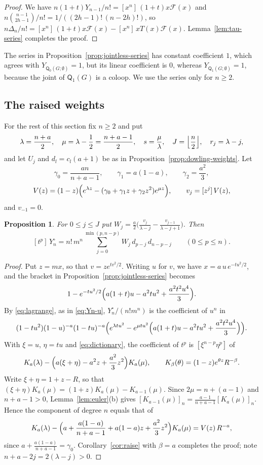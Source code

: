 \documentclass[11pt]{amsart}
\newtheorem{proposition}[theorem]{Proposition}
\theoremstyle{definition}
\theoremstyle{remark}
\numberwithin{equation}{section}
\newcommand{\Q}{\mathsf{Q}}
\begin{document}
\begin{proof}
We have $n(1+t)Y_{n-1}/n!=[x^n]\,(1+t)x\mathcal{F}(x)$ and $n\binom{n-1}{2h-1}/n!=1/((2h-1)!\,(n-2h)!)$, so $n\Delta_n/n!=[x^n]\,(1+t)x\mathcal F(x)-[x^n]\,xT(x)\mathcal{F}(x)$. Lemma~\ref{lem:tau-series} completes the proof.
\end{proof}

The series in Proposition~\ref{prop:jointless-series} has constant coefficient $1$, which agrees with $Y_{\Q_0(G;\emptyset)}=1$, but its linear coefficient is $0$, whereas $Y_{\Q_1(G;\emptyset)}=1$, because the joint of $\Q_1(G)$ is a coloop. We use the series only for $n\ge2$.

\subsection{The raised weights}
For the rest of this section fix $n\ge2$ and put
\[
\lambda=\frac{n+a}2,\quad\mu=\lambda-\frac12=\frac{n+a-1}2,\quad s=\frac\mu\lambda,\quad J=\Bigl\lfloor\frac n2\Bigr\rfloor,\quad r_j=\lambda-j,
\]
and let $U_j$ and $d_l=c_l(a+1)$ be as in Proposition~\ref{prop:dowling-weights}. Let
\[
\gamma_0=\frac{an}{n+a-1},\qquad\gamma_1=a(1-a),\qquad\gamma_2=\frac{a^2}3,
\]
\[
V(z)=(1-z)\Bigl(e^{\lambda z}-(\gamma_0+\gamma_1z+\gamma_2z^2)e^{\mu z}\Bigr),\qquad v_j=[z^j]\,V(z),
\]
and $v_{-1}=0$.

\begin{proposition}\label{prop:jointless-weights}
For $0\le j\le J$ put $W_j=\frac a2\bigl(\frac{v_j}{\lambda-j}-\frac{v_{j-1}}{\lambda-j+1}\bigr)$. Then
\[
[t^p]\,Y^\circ_n=n!\,m^n\sum_{j=0}^{\min(p,n-p)}W_j\,d_{p-j}\,d_{n-p-j}\qquad(0\le p\le n).
\]
\end{proposition}

\begin{proof}
Put $z=mx$, so that $v=ze^{tv^2/2}$. Writing $u$ for $v$, we have $x=a\,u\,e^{-tu^2/2}$, and the bracket in Proposition~\ref{prop:jointless-series} becomes
\[
1-e^{-tu^2/2}\Bigl(a(1+t)u-a^2tu^2+\frac{a^2t^2u^4}3\Bigr).
\]
By \eqref{eq:lagrange}, as in \eqref{eq:Yn-u}, $Y^\circ_n/(n!m^n)$ is the coefficient of $u^n$ in
\[
(1-tu^2)(1-u)^{-a}(1-tu)^{-a}\Bigl(e^{\lambda tu^2}-e^{\mu tu^2}\Bigl(a(1+t)u-a^2tu^2+\frac{a^2t^2u^4}3\Bigr)\Bigr).
\]
With $\xi=u$, $\eta=tu$ and \eqref{eq:dictionary}, the coefficient of $t^p$ is $[\xi^{n-p}\eta^p]$ of
\[
K_a(\lambda)-\Bigl(a(\xi+\eta)-a^2z+\frac{a^2}3z^2\Bigr)K_a(\mu),\qquad K_\beta(\theta)=(1-z)e^{\theta z}R^{-\beta}.
\]
Write $\xi+\eta=1+z-R$, so that $(\xi+\eta)K_a(\mu)=(1+z)K_a(\mu)-K_{a-1}(\mu)$. Since $2\mu=n+(a-1)$ and $n+a-1>0$, Lemma~\ref{lem:euler}(b) gives $[K_{a-1}(\mu)]_n=\frac{a-1}{n+a-1}[K_a(\mu)]_n$. Hence the component of degree $n$ equals that of
\[
K_a(\lambda)-\Bigl(a+\frac{a(1-a)}{n+a-1}+a(1-a)z+\frac{a^2}3z^2\Bigr)K_a(\mu)=V(z)\,R^{-a},
\]
since $a+\frac{a(1-a)}{n+a-1}=\gamma_0$. Corollary~\ref{cor:raise} with $\beta=a$ completes the proof; note $n+a-2j=2(\lambda-j)>0$.
\end{proof}
\end{document}
